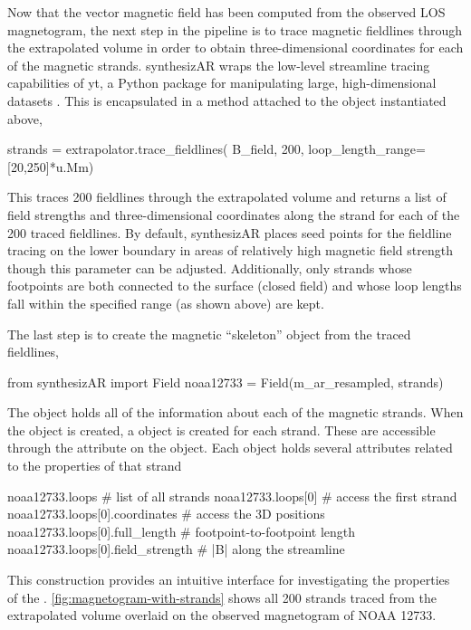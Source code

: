 Now that the vector magnetic field has been computed from the observed LOS magnetogram, the next step in the pipeline is to trace magnetic fieldlines through the extrapolated volume in order to obtain three-dimensional coordinates for each of the magnetic strands. synthesizAR wraps the low-level streamline tracing capabilities of yt, a Python package for manipulating large, high-dimensional datasets \citep{turk_yt_2011}. This is encapsulated in a method attached to the  object instantiated above,
\begin{pyblock}[chapter4][baselinestretch=1,xleftmargin=3em]
strands = extrapolator.trace_fieldlines(
    B_field, 200, loop_length_range=[20,250]*u.Mm)
\end{pyblock}
This traces 200 fieldlines through the extrapolated volume and returns a list of field strengths and three-dimensional coordinates along the strand for each of the 200 traced fieldlines. By default, synthesizAR places seed points for the fieldline tracing on the lower boundary in areas of relatively high magnetic field strength though this parameter can be adjusted. Additionally, only strands whose footpoints are both connected to the surface (closed field) and whose loop lengths fall within the specified range (as shown above) are kept.

The last step is to create the magnetic ``skeleton'' object from the traced fieldlines,
\begin{pyblock}[chapter4][baselinestretch=1,xleftmargin=3em]
from synthesizAR import Field
noaa12733 = Field(m_ar_resampled, strands)
\end{pyblock}
The  object holds all of the information about each of the magnetic strands. When the  object is created, a  object is created for each strand. These are accessible through the  attribute on the  object. Each  object holds several attributes related to the properties of that strand
\begin{pyblock}[chapter4][baselinestretch=1,xleftmargin=3em]
noaa12733.loops  # list of all strands
noaa12733.loops[0]  # access the first strand
noaa12733.loops[0].coordinates  # access the 3D positions
noaa12733.loops[0].full_length  # footpoint-to-footpoint length
noaa12733.loops[0].field_strength  # |B| along the streamline
\end{pyblock}
This construction provides an intuitive interface for investigating the properties of the \AR{}. \autoref{fig:magnetogram-with-strands} shows all 200 strands traced from the extrapolated volume overlaid on the observed magnetogram of NOAA 12733. 

